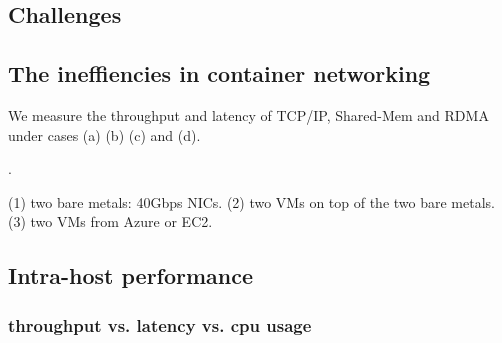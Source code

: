\subsection{Challenges}

\subsection{The ineffiencies in container networking}

We measure the throughput and latency of TCP/IP, Shared-Mem and RDMA under cases
(a) (b) (c) and (d).

.

(1) two bare metals: 40Gbps NICs.
(2) two VMs on top of the two bare metals.
(3) two VMs from Azure or EC2.

\subsection{Intra-host performance}
\subsubsection{throughput vs. latency vs. cpu usage}


